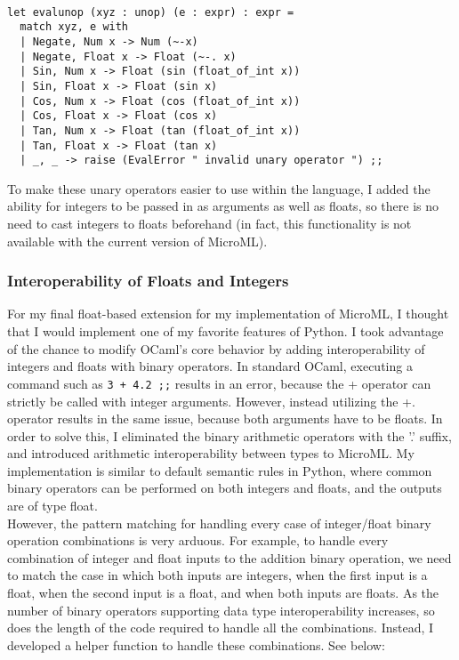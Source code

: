 \documentclass{article}
\begin{document}
\begin{verbatim}

let evalunop (xyz : unop) (e : expr) : expr = 
  match xyz, e with 
  | Negate, Num x -> Num (~-x)
  | Negate, Float x -> Float (~-. x)
  | Sin, Num x -> Float (sin (float_of_int x))
  | Sin, Float x -> Float (sin x)
  | Cos, Num x -> Float (cos (float_of_int x))
  | Cos, Float x -> Float (cos x)
  | Tan, Num x -> Float (tan (float_of_int x))
  | Tan, Float x -> Float (tan x)
  | _, _ -> raise (EvalError " invalid unary operator ") ;;
\end{verbatim}

To make these unary operators easier to use within the language, I added the ability for integers to be passed in as arguments as well as floats, so there is no need to cast integers to floats beforehand (in fact, this functionality is not available with the current version of MicroML). 

\subsubsection{Interoperability of Floats and Integers}

For my final float-based extension for my implementation of MicroML, I thought that I would implement one of my favorite features of Python. I took advantage of the chance to modify OCaml's core behavior by adding interoperability of integers and floats with binary operators. In standard OCaml, executing a command such as \texttt{3 + 4.2 ;;} results in an error, because the + operator can strictly be called with integer arguments. However, instead utilizing the +. operator results in the same issue, because both arguments have to be floats. In order to solve this, I eliminated the binary arithmetic operators with the '.' suffix, and introduced arithmetic interoperability between types to MicroML. My implementation is similar to default semantic rules in Python, where common binary operators can be performed on both integers and floats, and the outputs are of type float. \\

However, the pattern matching for handling every case of integer/float binary operation combinations is very arduous. For example, to handle every combination of integer and float inputs to the addition binary operation, we need to match the case in which both inputs are integers, when the first input is a float, when the second input is a float, and when both inputs are floats. As the number of binary operators supporting data type interoperability increases, so does the length of the code required to handle all the combinations. Instead, I developed a helper function to handle these combinations. See below:
\end{document}
